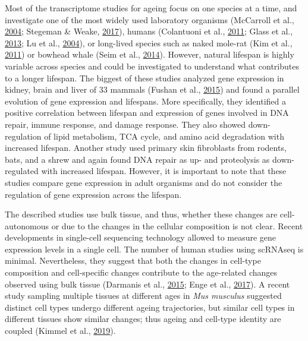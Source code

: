 \documentclass[12pt,twoside]{unicam}
\begin{document}
Most of the transcriptome studies for ageing focus on one species at a time, and investigate one of the most widely used laboratory organisms (McCarroll et al., \protect\hyperlink{ref-McCarroll2004}{2004}; Stegeman \& Weake, \protect\hyperlink{ref-Stegeman2017}{2017}), humans (Colantuoni et al., \protect\hyperlink{ref-Colantuoni2011}{2011}; Glass et al., \protect\hyperlink{ref-Glass2013}{2013}; Lu et al., \protect\hyperlink{ref-Lu2004}{2004}), or long-lived species such as naked mole-rat (Kim et al., \protect\hyperlink{ref-Kim2011}{2011}) or bowhead whale (Seim et al., \protect\hyperlink{ref-Seim2014}{2014}). However, natural lifespan is highly variable across species and could be investigated to understand what contributes to a longer lifespan. The biggest of these studies analyzed gene expression in kidney, brain and liver of 33 mammals (Fushan et al., \protect\hyperlink{ref-Fushan2015}{2015}) and found a parallel evolution of gene expression and lifespans. More specifically, they identified a positive correlation between lifespan and expression of genes involved in DNA repair, immune response, and damage response. They also showed down-regulation of lipid metabolism, TCA cycle, and amino acid degradation with increased lifespan. Another study used primary skin fibroblasts from rodents, bats, and a shrew and again found DNA repair as up- and proteolysis as down-regulated with increased lifespan. However, it is important to note that these studies compare gene expression in adult organisms and do not consider the regulation of gene expression across the lifespan.

The described studies use bulk tissue, and thus, whether these changes are cell-autonomous or due to the changes in the cellular composition is not clear. Recent developments in single-cell sequencing technology allowed to measure gene expression levels in a single cell. The number of human studies using scRNAseq is minimal. Nevertheless, they suggest that both the changes in cell-type composition and cell-specific changes contribute to the age-related changes observed using bulk tissue (Darmanis et al., \protect\hyperlink{ref-Darmanis2015}{2015}; Enge et al., \protect\hyperlink{ref-Enge2017}{2017}). A recent study sampling multiple tissues at different ages in \emph{Mus musculus} suggested distinct cell types undergo different ageing trajectories, but similar cell types in different tissues show similar changes; thus ageing and cell-type identity are coupled (Kimmel et al., \protect\hyperlink{ref-Kimmel2019}{2019}).
\end{document}
